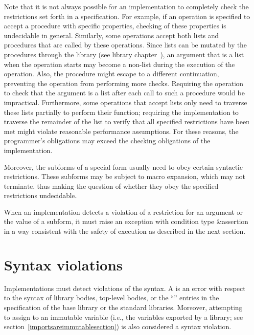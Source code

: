 Note that it is not always possible for an implementation to completely check
the restrictions set forth in a specification.  For example, if an
operation is specified to accept a procedure with specific properties,
checking of these properties is undecidable in general.  Similarly,
some operations accept both lists and procedures that are
called by these operations.  Since lists can be mutated by the procedures
through the  library (see library
chapter~), an argument that is a list
when the operation starts may become a non-list during the execution of the operation.
Also, the procedure might escape to a different continuation,
preventing the operation from performing more checks.
Requiring the operation to check that the argument is a list after
each call to such a procedure would be impractical.  Furthermore, some
operations that accept lists only need to traverse these lists
partially to perform their function; requiring the implementation to
traverse the remainder of the list to verify that all specified
restrictions have been met might
violate reasonable performance assumptions.  For these reasons, the
programmer's obligations may exceed the checking obligations of the
implementation.

Moreover, the subforms of a special form usually need to obey certain syntactic
restrictions.  These subforms may be subject to macro expansion, which
may not terminate, thus making the question of whether they obey the
specified restrictions undecidable.

When an implementation detects a violation of a restriction for an
argument or the value of a subform, it must raise an exception with
condition type {\cf\&assertion} in a way consistent with the safety of
execution as described in the next section.

\section{Syntax violations}

Implementations must detect
violations of the syntax.  A  is an error
with respect to the syntax of library bodies, top-level bodies,
or the ``\exprtype'' entries in the
specification of the base library or the standard libraries.
Moreover, attempting to assign to an immutable variable (i.e., the
variables exported by a library; see
section~\ref{importsareimmutablesection}) is also
considered a syntax violation.

